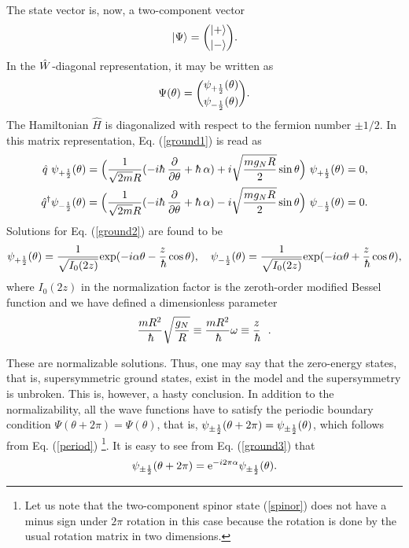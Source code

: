 \documentclass[a4paper,12pt]{article}
\begin{document}
The state vector is, now, a two-component vector
\begin{equation}
|{\Psi}\rangle={|{+}\rangle\choose |{-}\rangle}.
\label{spinor}
\end{equation}
In the $\hat W$-diagonal representation, it may be written as
\begin{equation}
\Psi(\theta)={\psi_{+{1\over2}}(\theta)\choose \psi_{-{1\over2}}(\theta)}.
\end{equation}
The Hamiltonian ${\hat H}$ is diagonalized with respect to the 
fermion number $\pm 1/2$. In this matrix 
representation, Eq. (\ref{ground1}) is read as
\begin{eqnarray}
{\hat q}~\psi_{+\half}(\theta)=
\Bigl({1\over {\sqrt{2m}R}}(-i\hbar~{\del\over{\del\theta}}+\hbar~\alpha) 
+ i\sqrt{{mg_NR\over 2}}\sin\theta\Bigr)~\psi_{+\half}(\theta)=0,
\nonumber\\
{\hat q}^{\dagger}\psi_{-\half}(\theta)=
\Bigl({1\over {\sqrt{2m}R}}(-i\hbar~{\del\over{\del\theta}}+\hbar~\alpha) 
- i\sqrt{{mg_NR\over 2}}\sin\theta\Bigr)~\psi_{-\half}(\theta)=0.
\label{ground2}
\end{eqnarray} 
Solutions for Eq. (\ref{ground2}) are found to be 
\begin{equation}
\psi_{+\half}(\theta)
={1\over \sqrt{I_0(2z)}}{\rm exp}(-i\alpha\theta-{z\over {\hbar}}\cos\theta),
\quad
\psi_{-\half}(\theta)
={1\over \sqrt{I_0(2z)}}{\rm exp}(-i\alpha\theta+{z\over{\hbar}}\cos\theta),
\label{ground3}
\end{equation} 
where $I_0(2z)$ in the normalization factor is the zeroth-order modified
Bessel function and we have defined a dimensionless parameter
$$
{{mR^2}\over \hbar}\sqrt{{g_N\over R}}
\equiv {mR^2\over \hbar}\omega
\equiv {z\over {\hbar}}~~.
$$
\par
These are normalizable solutions. Thus, one may 
say that the zero-energy states, that is, supersymmetric ground 
states, exist in the model and the supersymmetry is unbroken. 
This is, however, a hasty conclusion. 
In addition to the normalizability, all the wave functions 
have to satisfy the periodic boundary condition
$\Psi(\theta+2\pi)=\Psi(\theta)$, that is, $\psi_{\pm {1\over2}}(\theta+2\pi)
=\psi_{\pm {1\over2}}(\theta)$, which follows 
from Eq. (\ref{period}) \footnote{Let us note that the two-component spinor 
state (\ref{spinor}) does not have a minus  
sign under $2\pi$ rotation in this case because the 
rotation is done by the usual rotation matrix in two dimensions.}. 
It is easy to see from Eq. (\ref{ground3}) that
\begin{equation}
\psi_{\pm {1\over2}}(\theta+2\pi)={\rm e}^{-i2\pi\alpha}\psi_{\pm {1\over2}}(\theta).
\label{boundary}
\end{equation}
\end{document}
